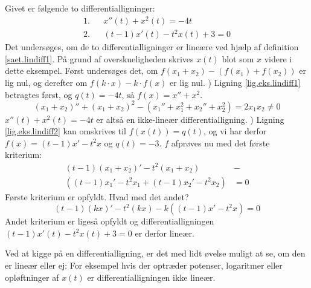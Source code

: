 \begin{example} \label{eks.lindiff1}
Givet er følgende to differentialligninger:
\begin{eqnarray}
1. && x''(t) + x^2(t) = -4t \label{lig.eks.lindiff1} \\
2. && (t-1)x'(t) - t^2x(t) + 3 = 0 \label{lig.eks.lindiff2} 
\end{eqnarray}
Det undersøges, om de to differentialligninger er lineære ved hjælp af definition \ref{saet.lindiff1}. På grund af overskueligheden skrives $ x(t) $ blot som $ x $ videre i dette eksempel. \bs
Først undersøges det, om $ f( x_1 + x_2 ) - (f( x_1 ) + f( x_2 )) $ er lig nul, og derefter om $ f(k \cdot x) - k \cdot f(x) $ er lig nul. ) Ligning \eqref{lig.eks.lindiff1} betragtes først, og $ q(t) = -4t $, så $ f(x) = x'' + x^2 $.
\begin{equation}
(x_1 + x_2)'' + (x_1 + x_2)^2 - (x_1'' + x_1^2 + x_2'' + x_2^2) = 2x_1x_2 \neq 0 
\end{equation}
$ x''(t) + x^2(t) = -4t $ er altså en ikke-lineær differentialligning. ) Ligning \eqref{lig.eks.lindiff2} kan omskrives til $ f(x(t)) = q(t) $, og vi har derfor $ f(x) = (t-1)x' - t^2x $ og $ q(t) = -3 $. $ f $ afprøves nu med det første kriterium:
\begin{equation}
\begin{aligned}
(t-1)(x_1 + x_2)' - t^2(x_1+x_2) &- \\
((t-1)x_1' - t^2x_1 + (t-1)x_2' - t^2x_2) &= 0
\end{aligned} 
\end{equation}
Første kriterium er opfyldt. Hvad med det andet?
\begin{equation}
(t-1)(kx)' - t^2(kx) - k((t-1)x' - t^2x) = 0 
\end{equation}
Andet kriterium er ligeså opfyldt og differentialligningen $ (t-1)x'(t) - t^2x(t) + 3 = 0 $ er derfor lineær.

\begin{info}
Ved at kigge på en differentialligning, er det med lidt øvelse muligt at se, om den er lineær eller ej: For eksempel hvis der optræder potenser, logaritmer eller opløftninger af $ x(t) $ er differentialligningen ikke lineær.
\end{info}
\end{example}


